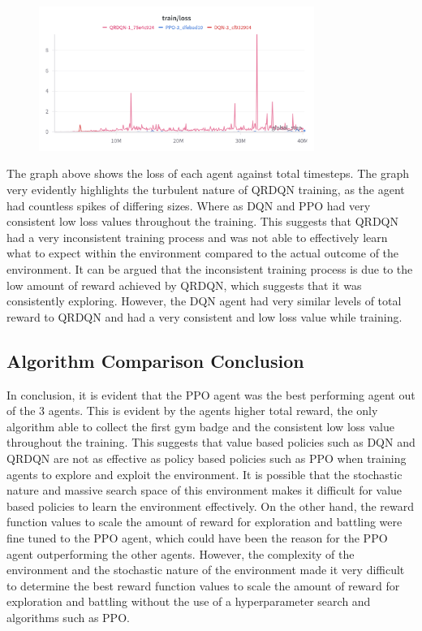 \begin{figure}[H]
    \centering
    \includegraphics[width=0.8\textwidth]{figures/all_step_loss.png}
    \caption{}
    \label{fig:agent_eval_all_loss}
\end{figure}

The graph above shows the loss of each agent against total timesteps. The graph very evidently highlights the turbulent nature of QRDQN training, as the agent had countless spikes of differing sizes. Where as DQN and PPO had very consistent low loss values throughout the training. This suggests that QRDQN had a very inconsistent training process and was not able to effectively learn what to expect within the environment compared to the actual outcome of the environment. It can be argued that the inconsistent training process is due to the low amount of reward achieved by QRDQN, which suggests that it was consistently exploring. However, the DQN agent had very similar levels of total reward to QRDQN and had a very consistent and low loss value while training. 

\subsection{Algorithm Comparison Conclusion}

In conclusion, it is evident that the PPO agent was the best performing agent out of the 3 agents. This is evident by the agents higher total reward, the only algorithm able to collect the first gym badge and the consistent low loss value throughout the training. This suggests that value based policies such as DQN and QRDQN are not as effective as policy based policies such as PPO when training agents to explore and exploit the environment. It is possible that the stochastic nature and massive search space of this environment makes it difficult for value based policies to learn the environment effectively. On the other hand, the reward function values to scale the amount of reward for exploration and battling were fine tuned to the PPO agent, which could have been the reason for the PPO agent outperforming the other agents. However, the complexity of the environment and the stochastic nature of the environment made it very difficult to determine the best reward function values to scale the amount of reward for exploration and battling without the use of a hyperparameter search and algorithms such as PPO. 

